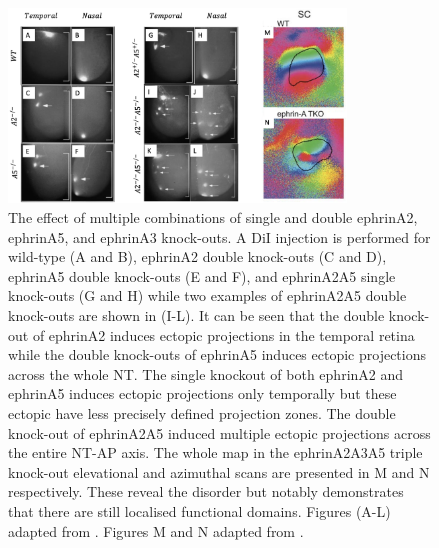 \begin{figure}
	\centering
	\includegraphics[width = 0.8\textwidth]{images/introduction/ephrinKO}
	\def\c{The effect of multiple combinations of single and double ephrinA2, ephrinA5, and ephrinA3 knock-outs. }
	\caption[\c]{\label{fig:ephrinknock-outs} \c A DiI injection is performed for wild-type (A and B), ephrinA2 double knock-outs (C and D), ephrinA5 double knock-outs (E and F), and ephrinA2A5 single knock-outs (G and H) while two examples of ephrinA2A5 double knock-outs are shown in (I-L). It can be seen that the double knock-out of ephrinA2 induces ectopic projections in the temporal retina while the double knock-outs of ephrinA5 induces ectopic projections across the whole NT. The single knockout of both ephrinA2 and ephrinA5 induces ectopic projections only temporally but these ectopic have less precisely defined projection zones. The double knock-out of ephrinA2A5 induced multiple ectopic projections across the entire NT-AP axis. The whole map in the ephrinA2A3A5 triple knock-out elevational and azimuthal scans are presented in M and N respectively. These reveal the disorder but notably demonstrates that there are still localised functional domains. Figures (A-L) adapted from \cite{Feldheim2000-ec}. Figures M and N adapted from \cite{Cang2008-ez}.}
\end{figure}
